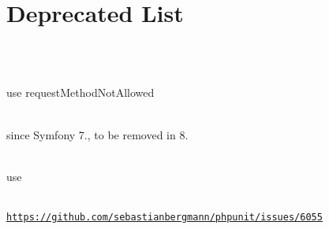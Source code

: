 \chapter{Deprecated List }
\hypertarget{deprecated}{}\label{deprecated}

\begin{DoxyRefList}
\item[Global \doxylink{class_dompdf_1_1_frame_decorator_1_1_abstract_frame_decorator_a54fbe0c81e5e423da7574d9ae50ac79a}{Abstract\+Frame\+Decorator\+::get\+\_\+original\+\_\+style} ()]\hfill \\
\label{deprecated__deprecated000044}%
%
  
\item[Global \doxylink{class_illuminate_1_1_routing_1_1_abstract_route_collection_a4deb800622764411a45498dcff101de0}{Abstract\+Route\+Collection\+::method\+Not\+Allowed} (array \$others, \$method)]\hfill \\
\label{deprecated__deprecated000121}%
%
use request\+Method\+Not\+Allowed 
\item[Class \doxylink{class_symfony_1_1_component_1_1_http_kernel_1_1_dependency_injection_1_1_add_annotated_classes_to_cache_pass}{Add\+Annotated\+Classes\+To\+Cache\+Pass} ]\hfill \\
\label{deprecated__deprecated000432}%
%
since Symfony 7., to be removed in 8.  
\item[Global \doxylink{class_nette_1_1_utils_1_1_arrays_aa7c1056f6a95387ecfba8223f838f9cc}{Arrays\+::search\+Key} (array \$array, \$key)]\hfill \\
\label{deprecated__deprecated000237}%
%
use   
\item[Global \doxylink{class_p_h_p_unit_1_1_framework_1_1_assert_af310d60ea5fc3a984b3b5870aa6972ab}{Assert\+::assert\+Contains\+Only} (string \$type, iterable \$haystack, ?bool \$is\+Native\+Type=null, string \$message=\textquotesingle{}\textquotesingle{})]\hfill \\
\label{deprecated__deprecated000287}%
%
\href{https://github.com/sebastianbergmann/phpunit/issues/6055}{\texttt{https\+://github.\+com/sebastianbergmann/phpunit/issues/6055}}  
\item[Global \doxylink{class_p_h_p_unit_1_1_framework_1_1_assert_a0a6312eb3534a806acd7375544bf7528}{Assert\+::assert\+Not\+Contains\+Only} (string \$type, iterable \$haystack, ?bool \$is\+Native\+Type=null, string \$message=\textquotesingle{}\textquotesingle{})]\hfill \\

\end{DoxyRefList}
